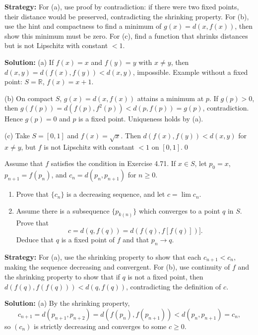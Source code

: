 \noindent\textbf{Strategy:} For (a), use proof by contradiction: if there were two fixed points, their distance would be preserved, contradicting the shrinking property. For (b), use the hint and compactness to find a minimum of $g(x) = d(x, f(x))$, then show this minimum must be zero. For (c), find a function that shrinks distances but is not Lipschitz with constant $< 1$.

\bigskip\noindent\textbf{Solution:}
(a) If $f(x)=x$ and $f(y)=y$ with $x\ne y$, then $d(x,y)=d(f(x),f(y))<d(x,y)$, impossible. Example without a fixed point: $S=\mathbb{R}$, $f(x)=x+1$.

(b) On compact $S$, $g(x)=d(x,f(x))$ attains a minimum at $p$. If $g(p)>0$, then $g(f(p))=d(f(p),f^2(p))<d(p,f(p))=g(p)$, contradiction. Hence $g(p)=0$ and $p$ is a fixed point. Uniqueness holds by (a).

(c) Take $S=[0,1]$ and $f(x)=\sqrt{x}$. Then $d(f(x),f(y))<d(x,y)$ for $x\ne y$, but $f$ is not Lipschitz with constant $<1$ on $[0,1]$.\qed



\begin{problembox}
\begin{problemstatement}
Assume that $f$ satisfies the condition in Exercise 4.71. If $x \in S$, let $p_0 = x$, $p_{n+1} = f(p_n)$, and $c_n = d(p_n, p_{n+1})$ for $n \geq 0$.
\begin{enumerate}[label=(\alph*)]
\item Prove that $\{c_n\}$ is a decreasing sequence, and let $c = \lim c_n$.
\item Assume there is a subsequence $\{p_{k(n)}\}$ which converges to a point $q$ in $S$. Prove that
\[c = d(q, f(q)) = d(f(q), f[f(q)])].\]
Deduce that $q$ is a fixed point of $f$ and that $p_n \to q$.
\end{enumerate}
\end{problemstatement}
\end{problembox}

\noindent\textbf{Strategy:} For (a), use the shrinking property to show that each $c_{n+1} < c_n$, making the sequence decreasing and convergent. For (b), use continuity of $f$ and the shrinking property to show that if $q$ is not a fixed point, then $d(f(q), f(f(q))) < d(q, f(q))$, contradicting the definition of $c$.

\bigskip\noindent\textbf{Solution:}
(a) By the shrinking property,
\[
c_{n+1}=d(p_{n+1},p_{n+2})=d(f(p_n),f(p_{n+1}))<d(p_n,p_{n+1})=c_n,
\]
so $(c_n)$ is strictly decreasing and converges to some $c\ge 0$.

